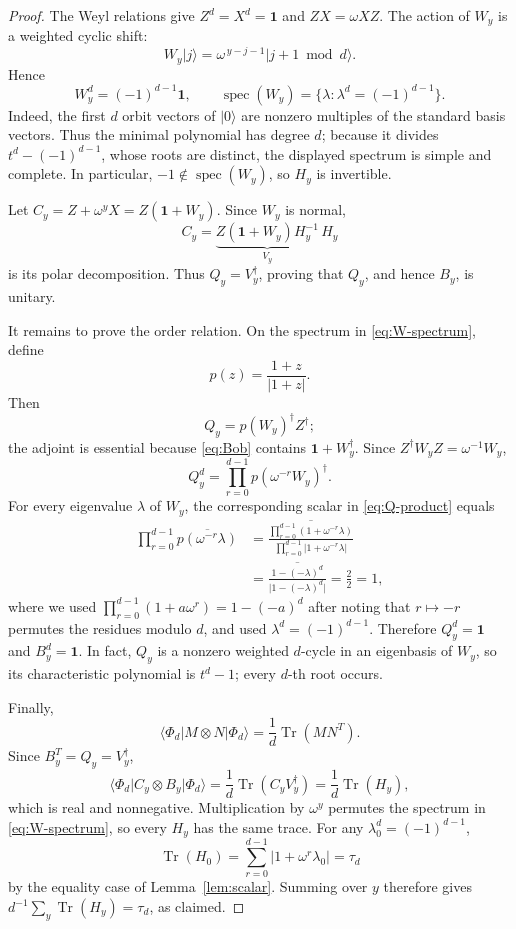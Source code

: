 \documentclass[11pt]{article}
\theoremstyle{remark}
\newcommand{\Id}{\mathbf 1}
\newcommand{\Tr}{\operatorname{Tr}}
\newcommand{\spec}{\operatorname{spec}}
\begin{document}
\begin{proof}
The Weyl relations give \(Z^d=X^d=\Id\) and \(ZX=\omega XZ\).
The action of \(W_y\) is a weighted cyclic shift:
\[
  W_y\lvert j\rangle
  =
  \omega^{\,y-j-1}\lvert j+1\bmod d\rangle.
\]
Hence
\begin{equation}
  W_y^d=(-1)^{d-1}\Id,
  \qquad
  \spec(W_y)=
  \{\lambda:\lambda^d=(-1)^{d-1}\}.
  \label{eq:W-spectrum}
\end{equation}
Indeed, the first \(d\) orbit vectors of \(\lvert0\rangle\) are nonzero
multiples of the standard basis vectors.  Thus the minimal polynomial has
degree \(d\); because it divides
\(t^d-(-1)^{d-1}\), whose roots are distinct, the displayed spectrum is
simple and complete.
In particular, \(-1\notin\spec(W_y)\), so \(H_y\) is invertible.

Let \(C_y=Z+\omega^yX=Z(\Id+W_y)\).  Since \(W_y\) is normal,
\[
  C_y
  =
  \underbrace{Z(\Id+W_y)H_y^{-1}}_{V_y}\,H_y
\]
is its polar decomposition.  Thus \(Q_y=V_y^\dagger\), proving that
\(Q_y\), and hence \(B_y\), is unitary.

It remains to prove the order relation.  On the spectrum in
\eqref{eq:W-spectrum}, define
\[
  p(z)=\frac{1+z}{\lvert1+z\rvert}.
\]
Then
\[
  Q_y=p(W_y)^\dagger Z^\dagger;
\]
the adjoint is essential because \eqref{eq:Bob} contains
\(\Id+W_y^\dagger\).  Since
\(
Z^\dagger W_yZ=\omega^{-1}W_y
\),
\begin{equation}
  Q_y^d
  =
  \prod_{r=0}^{d-1}p(\omega^{-r}W_y)^\dagger.
  \label{eq:Q-product}
\end{equation}
For every eigenvalue \(\lambda\) of \(W_y\), the corresponding scalar in
\eqref{eq:Q-product} equals
\begin{align*}
  \prod_{r=0}^{d-1}\overline{p(\omega^{-r}\lambda)}
  &=
  \overline{
  \frac{\prod_{r=0}^{d-1}(1+\omega^{-r}\lambda)}
       {\prod_{r=0}^{d-1}\lvert1+\omega^{-r}\lambda\rvert}}\\
  &=
  \overline{
  \frac{1-(-\lambda)^d}
       {\lvert1-(-\lambda)^d\rvert}}
  =\frac2{2}=1,
\end{align*}
where we used
\(
\prod_{r=0}^{d-1}(1+a\omega^r)=1-(-a)^d
\)
after noting that \(r\mapsto-r\) permutes the residues modulo \(d\), and
used \(\lambda^d=(-1)^{d-1}\).  Therefore \(Q_y^d=\Id\) and
\(B_y^d=\Id\).  In fact, \(Q_y\) is a nonzero weighted \(d\)-cycle in
an eigenbasis of \(W_y\), so its characteristic polynomial is
\(t^d-1\); every \(d\)-th root occurs.

Finally,
\[
  \langle\Phi_d\vert M\otimes N\vert\Phi_d\rangle
  =
  \frac1d\Tr(MN^T).
\]
Since \(B_y^T=Q_y=V_y^\dagger\),
\[
  \langle\Phi_d\vert C_y\otimes B_y\vert\Phi_d\rangle
  =
  \frac1d\Tr(C_yV_y^\dagger)
  =
  \frac1d\Tr(H_y),
\]
which is real and nonnegative.  Multiplication by \(\omega^y\) permutes
the spectrum in \eqref{eq:W-spectrum}, so every \(H_y\) has the same trace.
For any \(\lambda_0^d=(-1)^{d-1}\),
\[
  \Tr(H_0)
  =
  \sum_{r=0}^{d-1}\lvert1+\omega^r\lambda_0\rvert
  =
  \tau_d
\]
by the equality case of Lemma~\ref{lem:scalar}.  Summing over \(y\)
therefore gives
\(
d^{-1}\sum_y\Tr(H_y)=\tau_d
\),
as claimed.
\end{proof}
\end{document}
